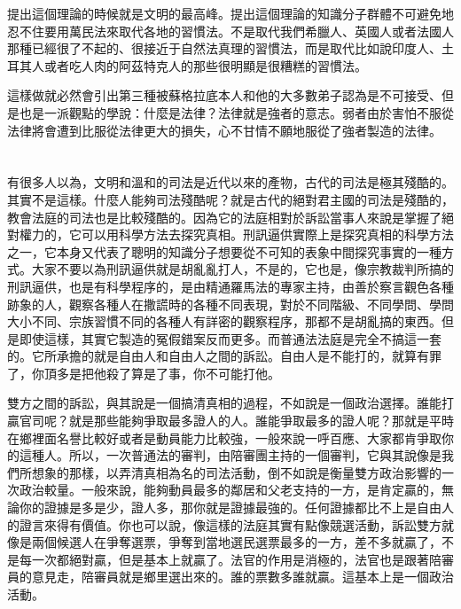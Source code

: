 提出這個理論的時候就是文明的最高峰。提出這個理論的知識分子群體不可避免地忍不住要用萬民法來取代各地的習慣法。不是取代我們希臘人、英國人或者法國人那種已經很了不起的、很接近于自然法真理的習慣法，而是取代比如說印度人、土耳其人或者吃人肉的阿茲特克人的那些很明顯是很糟糕的習慣法。

這樣做就必然會引出第三種被蘇格拉底本人和他的大多數弟子認為是不可接受、但是也是一派觀點的學說：什麼是法律？法律就是強者的意志。弱者由於害怕不服從法律將會遭到比服從法律更大的損失，心不甘情不願地服從了強者製造的法律。


\section{}




有很多人以為，文明和溫和的司法是近代以來的產物，古代的司法是極其殘酷的。其實不是這樣。什麼人能夠司法殘酷呢？就是古代的絕對君主國的司法是殘酷的，教會法庭的司法也是比較殘酷的。因為它的法庭相對於訴訟當事人來說是掌握了絕對權力的，它可以用科學方法去探究真相。刑訊逼供實際上是探究真相的科學方法之一，它本身又代表了聰明的知識分子想要從不可知的表象中間探究事實的一種方式。大家不要以為刑訊逼供就是胡亂亂打人，不是的，它也是，像宗教裁判所搞的刑訊逼供，也是有科學程序的，是由精通羅馬法的專家主持，由善於察言觀色各種跡象的人，觀察各種人在撒謊時的各種不同表現，對於不同階級、不同學問、學問大小不同、宗族習慣不同的各種人有詳密的觀察程序，那都不是胡亂搞的東西。但是即使這樣，其實它製造的冤假錯案反而更多。而普通法法庭是完全不搞這一套的。它所承擔的就是自由人和自由人之間的訴訟。自由人是不能打的，就算有罪了，你頂多是把他殺了算是了事，你不可能打他。

雙方之間的訴訟，與其說是一個搞清真相的過程，不如說是一個政治選擇。誰能打贏官司呢？就是那些能夠爭取最多證人的人。誰能爭取最多的證人呢？那就是平時在鄉裡面名譽比較好或者是動員能力比較強，一般來說一呼百應、大家都肯爭取你的這種人。所以，一次普通法的審判，由陪審團主持的一個審判，它與其說像是我們所想象的那樣，以弄清真相為名的司法活動，倒不如說是衡量雙方政治影響的一次政治較量。一般來說，能夠動員最多的鄰居和父老支持的一方，是肯定贏的，無論你的證據是多是少，證人多，那你就是證據最強的。任何證據都比不上是自由人的證言來得有價值。你也可以說，像這樣的法庭其實有點像競選活動，訴訟雙方就像是兩個候選人在爭奪選票，爭奪到當地選民選票最多的一方，差不多就贏了，不是每一次都絕對贏，但是基本上就贏了。法官的作用是消極的，法官也是跟著陪審員的意見走，陪審員就是鄉里選出來的。誰的票數多誰就贏。這基本上是一個政治活動。

